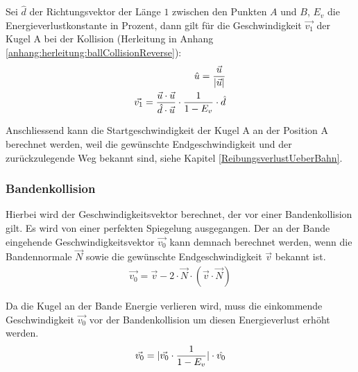 Sei $\hat{d}$ der Richtungsvektor der Länge $1$ zwischen den Punkten $A$ und $B$, $E_v$ die Energieverlustkonstante in
Prozent, dann gilt für die Geschwindigkeit $\vec{v_1}$ der Kugel A bei der Kollision (Herleitung in Anhang \ref{anhang:herleitung:ballCollisionReverse}):
\begin{align}
    \hat{u} = \frac{\vec{u}}{\lvert \vec{u} \rvert}\\
    \vec{v_1} = \frac{\vec{u} \cdot \vec{u}}{\hat{d} \cdot \vec{u}} \cdot \frac{1}{1 - E_v} \cdot \hat{d}
\end{align}

Anschliessend kann die Startgeschwindigkeit der Kugel A an der Position A berechnet werden, weil die gewünschte
Endgeschwindigkeit und der zurückzulegende Weg bekannt sind, siehe Kapitel \ref{ReibungsverlustUeberBahn}.

\subsubsection{Bandenkollision}

Hierbei wird der Geschwindigkeitsvektor berechnet, der vor einer Bandenkollision gilt.
Es wird von einer perfekten Spiegelung ausgegangen. Der an der Bande eingehende
Geschwindigkeitsvektor $\vec{v_0}$ kann demnach berechnet werden, wenn die Bandennormale $\vec{N}$ sowie die
gewünschte Endgeschwindigkeit $\vec{v}$ bekannt ist.
\begin{align}
    \vec{v_0} = \vec{v} - 2 \cdot \vec{N} \cdot (\vec{v} \cdot \vec{N})
\end{align}

Da die Kugel an der Bande Energie verlieren wird,
muss die einkommende Geschwindigkeit $\vec{v_0}$ vor der Bandenkollision um diesen Energieverlust erhöht werden.
\begin{align}
    \vec{v_0} = \lvert \vec{v_0} \cdot \frac{1}{1 - E_v} \rvert \cdot \hat{v_0}
\end{align}